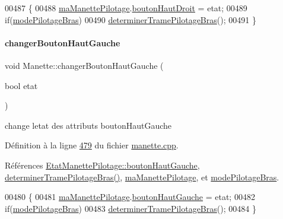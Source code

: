 \begin{DoxyCode}
00487 \{
00488     \hyperlink{class_manette_aeb3e02eaeaec4c656f78ed8fc6dae342}{maManettePilotage}.\hyperlink{struct_etat_manette_pilotage_ae0ca75dab8c31fe26d440ec319e2fa84}{boutonHautDroit} = etat;
00489     \textcolor{keywordflow}{if}(\hyperlink{class_manette_acc2cd9afa45328c0da5c580e5c1a67db}{modePilotageBras})
00490         \hyperlink{class_manette_ab5eb6972f366aa7527b2b27da5539638}{determinerTramePilotageBras}();
00491 \}
\end{DoxyCode}
\mbox{\label{class_manette_a739830941c396dabb7c57862a1880a34}} 
\paragraph{\texorpdfstring{changer\+Bouton\+Haut\+Gauche}{changerBoutonHautGauche}}
{\footnotesize\ttfamily void Manette\+::changer\+Bouton\+Haut\+Gauche (\begin{DoxyParamCaption}\item[{bool}]{etat }\end{DoxyParamCaption})\hspace{0.3cm}{\ttfamily [slot]}}



change l\textquotesingle{}etat des attributs bouton\+Haut\+Gauche 



Définition à la ligne \hyperlink{manette_8cpp_source_l00479}{479} du fichier \hyperlink{manette_8cpp_source}{manette.\+cpp}.



Références \hyperlink{manette_8h_source_l00156}{Etat\+Manette\+Pilotage\+::bouton\+Haut\+Gauche}, \hyperlink{manette_8cpp_source_l00375}{determiner\+Trame\+Pilotage\+Bras()}, \hyperlink{manette_8h_source_l00246}{ma\+Manette\+Pilotage}, et \hyperlink{manette_8h_source_l00254}{mode\+Pilotage\+Bras}.


\begin{DoxyCode}
00480 \{
00481     \hyperlink{class_manette_aeb3e02eaeaec4c656f78ed8fc6dae342}{maManettePilotage}.\hyperlink{struct_etat_manette_pilotage_aef8579e406e8766c1936db6da460492a}{boutonHautGauche} = etat;
00482     \textcolor{keywordflow}{if}(\hyperlink{class_manette_acc2cd9afa45328c0da5c580e5c1a67db}{modePilotageBras})
00483         \hyperlink{class_manette_ab5eb6972f366aa7527b2b27da5539638}{determinerTramePilotageBras}();
00484 \}
\end{DoxyCode}
\mbox{\label{class_manette_a37710e94b9d871a577740daf13cb571b}} 
